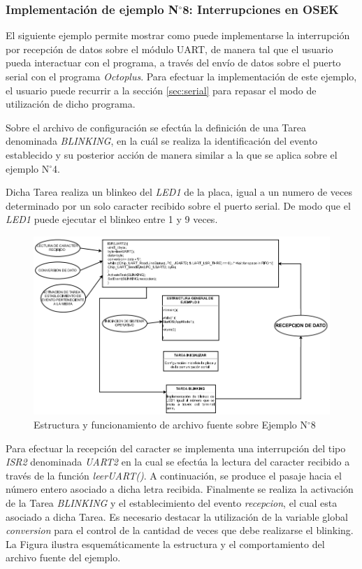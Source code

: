 \documentclass[12pt,letterpaper]{article}
\begin{document}
\subsubsection{Implementación de ejemplo N$^{\circ}$8: Interrupciones en OSEK}
El siguiente ejemplo permite mostrar como puede implementarse la interrupción por recepción de datos sobre el módulo UART, de manera tal que el usuario pueda interactuar con el programa, a través del envío de datos sobre el puerto serial con el programa \textit{Octoplus}. Para efectuar la implementación de este ejemplo, el usuario puede recurrir a la sección \ref{sec:serial} para repasar el modo de utilización de dicho programa.

Sobre el archivo de configuración se efectúa la definición de una Tarea denominada \textit{BLINKING}, en la cuál se realiza la identificación del evento establecido y su posterior acción de manera similar a la que se aplica sobre el ejemplo N$^{\circ}$4. 

Dicha Tarea realiza un blinkeo del \textit{LED1} de la placa, igual a un numero de veces determinado por un solo caracter recibido sobre el puerto serial. De modo que el \textit{LED1} puede ejecutar el blinkeo entre 1 y 9 veces.
\begin{center}
\begin{figure}[!h]
\centering
\includegraphics[width=15 cm]{figuras/f39.png}
\caption{Estructura y funcionamiento de archivo fuente sobre Ejemplo N$^{\circ}$8}
\label{Fig46}
\end{figure}
\end{center}
Para efectuar la recepción del caracter se implementa una interrupción del tipo \textit{ISR2} denominada \textit{UART2} en la cual se efectúa la lectura del caracter recibido a través de la función \textit{leerUART()}. A continuación, se produce el pasaje hacia el número entero asociado a dicha letra recibida. Finalmente se realiza la activación de la Tarea \textit{BLINKING} y el establecimiento del evento \textit{recepcion}, el cual esta asociado a dicha Tarea. Es necesario destacar la utilización de la variable global \textit{conversion} para el control de la cantidad de veces que debe realizarse el blinking. La Figura  ilustra esquemáticamente la estructura y el comportamiento del archivo fuente del ejemplo.
\end{document}
